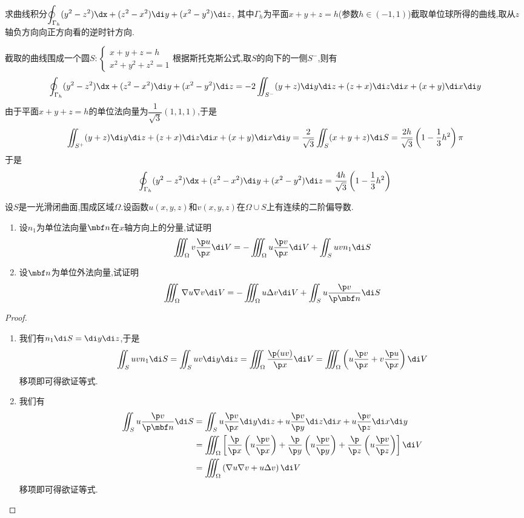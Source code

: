 \documentclass{ctexart}
\begin{document}
\begin{problem}[L.6.4]
    求曲线积分$\displaystyle\oint_{\Gamma_h}(y^2-z^2)\dx+(z^2-x^2)\di y+(x^2-y^2)\di z$,%
    其中$\Gamma_h$为平面$x+y+z=h$(参数$h\in(-1,1)$)截取单位球所得的曲线,取从$z$轴负方向向正方向看的逆时针方向.
\end{problem}
\begin{solution}
    截取的曲线围成一个圆$S:\left\{\begin{array}{l}
        x+y+z=h\\x^2+y^2+z^2=1
    \end{array}\right.$根据斯托克斯公式,取$S$的向下的一侧$S^-$,则有
    \[\oint_{\Gamma_h}(y^2-z^2)\dx+(z^2-x^2)\di y+(x^2-y^2)\di z
    =-2\iint_{S^-}(y+z)\di y\di z+(z+x)\di z\di x+(x+y)\di x\di y\]
    由于平面$x+y+z=h$的单位法向量为$\dfrac{1}{\sqrt{3}}\left(1,1,1\right)$,于是
    \[\iint_{S^+}(y+z)\di y\di z+(z+x)\di z\di x+(x+y)\di x\di y
    = \dfrac{2}{\sqrt3}\iint_{S}(x+y+z)\di S
    = \dfrac{2h}{\sqrt{3}}\left(1-\dfrac13h^2\right)\pi\]
    于是
    \[\oint_{\Gamma_h}(y^2-z^2)\dx+(z^2-x^2)\di y+(x^2-y^2)\di z=\dfrac{4h}{\sqrt{3}}\left(1-\dfrac{1}{3}h^2\right)\]
\end{solution}
\begin{problem}[L.6.5]
    设$S$是一光滑闭曲面,围成区域$\Omega$.设函数$u(x,y,z)$和$v(x,y,z)$在$\Omega\cup S$上有连续的二阶偏导数.
    \begin{enumerate}[label=\tbf{(\arabic*)}]
        \item 设$n_1$为单位法向量$\mbf n$在$x$轴方向上的分量,试证明
            \[\iiint_{\Omega}v\dfrac{\p u}{\p x}\di V=-\iiint_{\Omega}u\dfrac{\p v}{\p x}\di V+\iint_Suvn_1\di S\]
        \item 设$\mbf n$为单位外法向量,试证明
            \[\iiint_{\Omega}\nabla u\nabla v\di V=-\iiint_{\Omega}u\Delta v\di V+\iint_Su\dfrac{\p v}{\p\mbf n}\di S\]
    \end{enumerate}
\end{problem}
\begin{proof}
    \begin{enumerate}[label=\tbf{(\arabic*)}]
        \item 我们有$n_1\di S=\di y\di z$,于是
            \[\iint_{S}uvn_1\di S=\iint_{S}uv\di y\di z=\iiint_{\Omega}\dfrac{\p(uv)}{\p x}\di V=\iiint_{\Omega}\left(u\dfrac{\p v}{\p x}+v\dfrac{\p u}{\p x}\right)\di V\]
            移项即可得欲证等式.
        \item 我们有
            \[\begin{aligned}
                \iint_{S}u\dfrac{\p v}{\p\mbf n}\di S
                &= \iint_{S}u\dfrac{\p v}{\p x}\di y\di z+u\dfrac{\p v}{\p y}\di z\di x+u\dfrac{\p v}{\p z}\di x\di y \\
                &= \iiint_{\Omega}\left[\dfrac{\p}{\p x}\left(u\dfrac{\p v}{\p x}\right)+\dfrac{\p}{\p y}\left(u\dfrac{\p v}{\p y}\right)+\dfrac{\p}{\p z}\left(u\dfrac{\p v}{\p z}\right)\right]\di V \\
                &= \iiint_{\Omega}\left(\nabla u\nabla v+u\Delta v\right)\di V
            \end{aligned}\]
            移项即可得欲证等式.
    \end{enumerate}
\end{proof}
\end{document}
